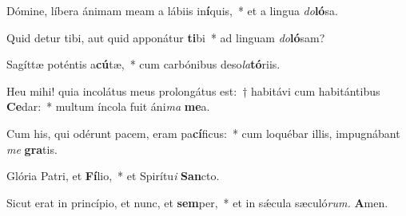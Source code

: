 \item Dómine, líbera ánimam meam a lábiis in\textbf{í}quis,~* et a lingua \textit{do}\textbf{ló}sa.
\item Quid detur tibi, aut quid apponátur \textbf{ti}bi~* ad linguam \textit{do}\textbf{ló}sam?
\item Sagíttæ poténtis a\textbf{cú}tæ,~* cum carbónibus deso\tinyhspace\textit{la}\textbf{tó}riis.
\item Heu mihi! quia incolátus meus prolongátus est:~† habitávi cum habitántibus \textbf{Ce}dar:~* multum íncola fuit áni\textit{ma} \textbf{me}a.
\item Cum his, qui odérunt pacem, eram pa\textbf{cí}ficus:~* cum loquébar illis, impugnábant \textit{me} \textbf{gra}tis.
\item Glória Patri, et \textbf{Fí}lio,~* et Spirítu\textit{i} \textbf{San}cto.
\item Sicut erat in princípio, et nunc, et \textbf{sem}per,~* et in sǽcula sæculó\textit{rum.} \textbf{A}men.